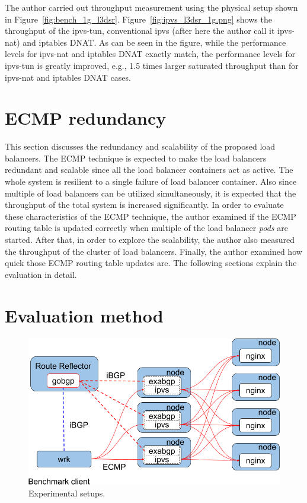 The author carried out throughput measurement using the physical setup shown in Figure~\ref{fig:bench_1g_l3dsr}.
Figure~\ref{fig:ipvs_l3dsr_1g.png} shows the throughput of the ipvs-tun, conventional ipvs (after here the author call it ipvs-nat) and iptables DNAT.
As can be seen in the figure, while the performance levels for ipvs-nat and iptables DNAT exactly match, the performance levels for ipvs-tun is greatly improved, e.g., 1.5 times larger saturated throughput than for ipvs-nat and iptables DNAT cases.

\FloatBarrier

\section{ECMP redundancy}

This section discusses the redundancy and scalability of the proposed load balancers.
The ECMP technique is expected to make the load balancers redundant and scalable since all the load balancer containers act as active.
The whole system is resilient to a single failure of load balancer container.
Also since multiple of load balancers can be utilized simultaneously, it is expected that the throughput of the total system is increased significantly.
In order to evaluate these characteristics of the ECMP technique,
the author examined if the ECMP routing table is updated correctly when multiple of the load balancer {\em pods} are started.
After that, in order to explore the scalability, the author also measured the throughput of the cluster of load balancers.
Finally, the author examined how quick those ECMP routing table updates are.
The following sections explain the evaluation in detail.

\section{Evaluation method}

\begin{figure}[b]
  \centering
    \includegraphics[width=0.9\columnwidth]{Figs/lb_ecmp_schem}
    \caption{Experimental setups.}
    \label{fig:lb_ecmp_schem}
\end{figure}


